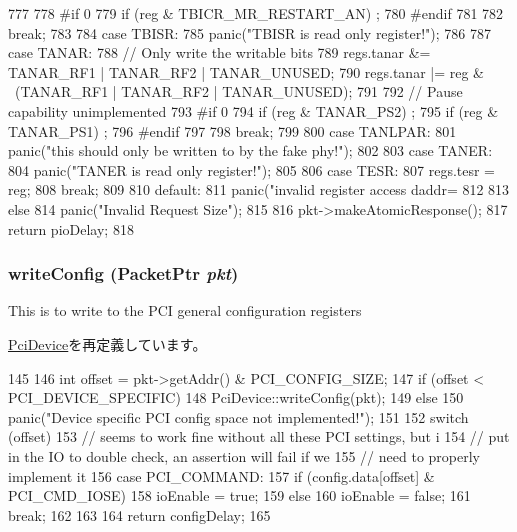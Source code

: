 \begin{DoxyCode}
{{{777 
778 #if 0
779             if (reg & TBICR_MR_RESTART_AN) ;
780 #endif
781 
782             break;
783 
784           case TBISR:
785             panic("TBISR is read only register!\n");
786 
787           case TANAR:
788             // Only write the writable bits
789             regs.tanar &= TANAR_RF1 | TANAR_RF2 | TANAR_UNUSED;
790             regs.tanar |= reg & ~(TANAR_RF1 | TANAR_RF2 | TANAR_UNUSED);
791 
792             // Pause capability unimplemented
793 #if 0
794             if (reg & TANAR_PS2) ;
795             if (reg & TANAR_PS1) ;
796 #endif
797 
798             break;
799 
800           case TANLPAR:
801             panic("this should only be written to by the fake phy!\n");
802 
803           case TANER:
804             panic("TANER is read only register!\n");
805 
806           case TESR:
807             regs.tesr = reg;
808             break;
809 
810           default:
811             panic("invalid register access daddr=%
812         }
813     } else {
814         panic("Invalid Request Size");
815     }
816     pkt->makeAtomicResponse();
817     return pioDelay;
818 }
\end{DoxyCode}
\hypertarget{classNSGigE_aac7b61a78530109bfa20923a53064bbf}{
\subsubsection[{writeConfig}]{ writeConfig ({\bf PacketPtr} {\em pkt})}}
\label{classNSGigE_aac7b61a78530109bfa20923a53064bbf}
This is to write to the PCI general configuration registers 

\hyperlink{classPciDevice_aac7b61a78530109bfa20923a53064bbf}{PciDevice}を再定義しています。


\begin{DoxyCode}
145 {
146     int offset = pkt->getAddr() & PCI_CONFIG_SIZE;
147     if (offset < PCI_DEVICE_SPECIFIC)
148         PciDevice::writeConfig(pkt);
149     else
150         panic("Device specific PCI config space not implemented!\n");
151 
152     switch (offset) {
153         // seems to work fine without all these PCI settings, but i
154         // put in the IO to double check, an assertion will fail if we
155         // need to properly implement it
156       case PCI_COMMAND:
157         if (config.data[offset] & PCI_CMD_IOSE)
158             ioEnable = true;
159         else
160             ioEnable = false;
161         break;
162     }
163 
164     return configDelay;
165 }
\end{DoxyCode}



